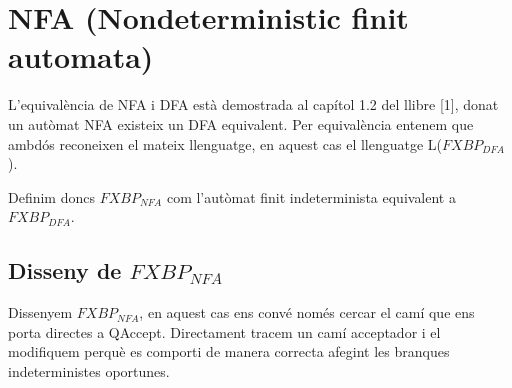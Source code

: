 \documentclass[12pt,a4paper]{report}
\def \dfa{$FXBP_{DFA} $}
\def \nfa{$FXBP_{NFA} $}
\begin{document}
\clearpage

\section{NFA (Nondeterministic finit automata)}

L’equivalència de NFA i DFA està demostrada al capítol 1.2 del llibre [1], donat un autòmat NFA existeix un DFA equivalent. Per equivalència entenem que ambdós reconeixen el mateix llenguatge, en aquest cas el llenguatge L(\dfa{}).

Definim doncs \nfa{} com l’autòmat finit indeterminista equivalent a \dfa{}.

\subsection{Disseny de \nfa{}}

Dissenyem \nfa{}, en aquest cas ens convé només cercar el camí que ens porta directes a QAccept. Directament tracem un camí acceptador i el modifiquem perquè es comporti de manera correcta afegint les branques indeterministes oportunes.
\end{document}
